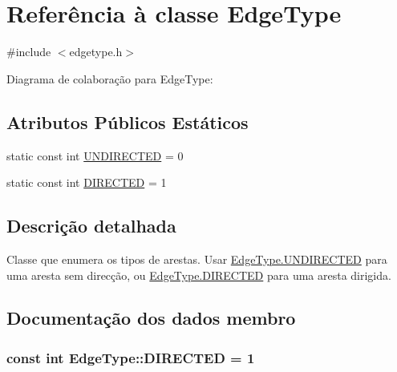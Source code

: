 \hypertarget{class_edge_type}{}\section{Referência à classe Edge\+Type}
\label{class_edge_type}


{\ttfamily \#include $<$edgetype.\+h$>$}



Diagrama de colaboração para Edge\+Type\+:
\subsection*{Atributos Públicos Estáticos}
\begin{DoxyCompactItemize}
\item 
static const int \hyperlink{class_edge_type_a6533cc56d05c288a550b9980b66c9317}{U\+N\+D\+I\+R\+E\+C\+T\+E\+D} = 0
\item 
static const int \hyperlink{class_edge_type_a903017a534f2818c2d17145e4ae0321c}{D\+I\+R\+E\+C\+T\+E\+D} = 1
\end{DoxyCompactItemize}


\subsection{Descrição detalhada}
Classe que enumera os tipos de arestas. Usar \hyperlink{class_edge_type_a6533cc56d05c288a550b9980b66c9317}{Edge\+Type.\+U\+N\+D\+I\+R\+E\+C\+T\+E\+D} para uma aresta sem direcção, ou \hyperlink{class_edge_type_a903017a534f2818c2d17145e4ae0321c}{Edge\+Type.\+D\+I\+R\+E\+C\+T\+E\+D} para uma aresta dirigida. 

\subsection{Documentação dos dados membro}
\hypertarget{class_edge_type_a903017a534f2818c2d17145e4ae0321c}{}
\subsubsection[{D\+I\+R\+E\+C\+T\+E\+D}]{\setlength{\rightskip}{0pt plus 5cm}const int Edge\+Type\+::\+D\+I\+R\+E\+C\+T\+E\+D = 1\hspace{0.3cm}{\ttfamily [static]}}\label{class_edge_type_a903017a534f2818c2d17145e4ae0321c}
\hypertarget{class_edge_type_a6533cc56d05c288a550b9980b66c9317}{}

